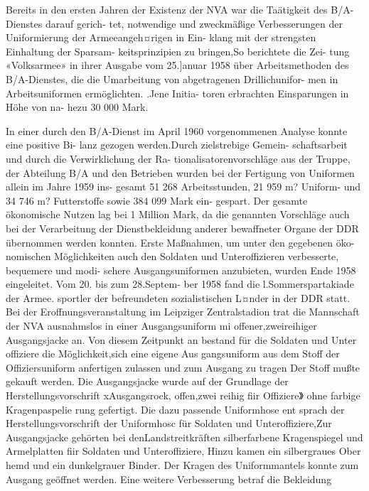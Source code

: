

Bereits in den ersten Jahren der Existenz der NVA
war die Taätigkeit des B/A-Dienstes darauf gerich-
tet, notwendige und zweckmäßige Verbesserungen
der Uniformierung der Armeeangeh¤rigen in Ein-
klang mit der strengsten Einhaltung der Sparsam-
keitsprinzipien zu bringen,So berichtete die Zei-
tung «Volksarmee» in ihrer Ausgabe vom 25.]anuar
1958 über Arbeitsmethoden des B/A-Dienstes, die
die Umarbeitung von abgetragenen Drillichunifor-
men in Arbeitsuniformen ermöglichten. .Jene Initia-
toren erbrachten Einsparungen in Höhe von na-
hezu 30 000 Mark.

In einer durch den B/A-Dienst im April 1960
vorgenommenen Analyse konnte eine positive Bi-
lanz gezogen werden.Durch zielstrebige Gemein-
schaftsarbeit und durch die Verwirklichung der Ra-
tionalisatorenvorschläge aus der Truppe,
der
Abteilung B/A und den Betrieben wurden bei der
Fertigung von Uniformen allein im Jahre 1959 ins-
gesamt 51 268 Arbeitsstunden, 21 959 m? Uniform-
und 34 746 m? Futterstoffe sowie 384 099 Mark ein-
gespart. Der gesamte ökonomische Nutzen lag bei
1 Million Mark, da die genannten Vorschläge auch
bei der Verarbeitung der Dienstbekleidung anderer
bewaffneter Organe der DDR übernommen werden
konnten.
Erste Maßnahmen, um unter den gegebenen öko-
nomischen Möglichkeiten auch den Soldaten und
Unteroffizieren verbesserte, bequemere und modi-
schere Ausgangsuniformen anzubieten, wurden Ende 1958 eingeleitet. Vom 20. bis zum 28.Septem-
ber 1958 fand die l.Sommerspartakiade der Armee.
sportler der befreundeten sozialistischen L¤nder in
der DDR statt. Bei der Eroffnungsveranstaltung im
Leipziger Zentralstadion trat die Mannschaft der
NVA ausnahmslos in einer Ausgangsuniform mi
offener,zweireihiger Ausgangsjacke an. Von diesem
Zeitpunkt an bestand für die Soldaten und Unter
offiziere die Möglichkeit,sich eine eigene Aus
gangsuniform aus dem Stoff der Offiziersuniform
anfertigen zulassen und zum Ausgang zu tragen
Der Stoff mußte gekauft werden.
Die Ausgangsjacke wurde auf der Grundlage der
Herstellungsvorschrift xAusgangsrock, offen,zwei
reihig fiir Offiziere》 ohne farbige Kragenpaspelie
rung gefertigt. Die dazu passende Uniformhose ent
sprach der Herstellungsvorschrift der Uniformhosc
für Soldaten und Unteroffiziere,Zur Ausgangsjacke
gehörten bei denLandstreitkräften silberfarbene
Kragenspiegel und Armelplatten fiir Soldaten und
Unteroffiziere, Hinzu kamen ein silbergraues Ober
hemd und ein dunkelgrauer Binder. Der Kragen
des Uniformmantels konnte zum Ausgang geöffnet
werden.
Eine weitere Verbesserung betraf die Bekleidung
